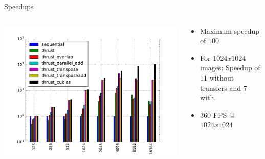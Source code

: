 \documentclass{beamer}
\begin{document}
\begin{frame}{Speedups}
  \begin{columns}
    \begin{column}{7cm}
      \includegraphics[scale=0.4]{imgs/all_speedups.pdf} 
    \end{column}
    \begin{column}{3cm}
      \begin{itemize}
        \item Maximum speedup of $100$
        \item For $1024x1024$ images: Speedup of $11$ without transfers and $7$ with.
\item $360$ FPS @ $1024x1024$
      \end{itemize}
    \end{column}
  \end{columns}
\end{frame} 
\end{document}

